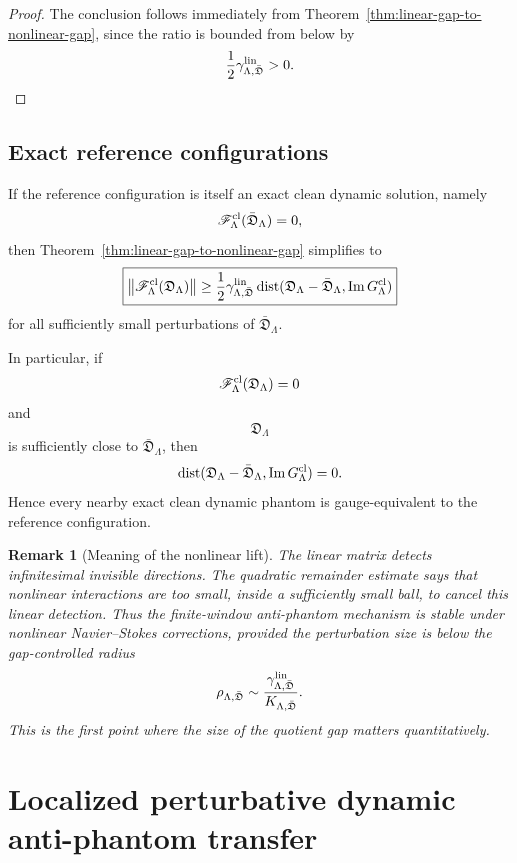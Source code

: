 \documentclass[11pt]{article}
\numberwithin{equation}{section}
\newtheorem{remark}[theorem]{Remark}
\begin{document}
\begin{proof}
The conclusion follows immediately from
Theorem~\ref{thm:linear-gap-to-nonlinear-gap}, since the ratio is bounded
from below by
\[
        \frac12
        \gamma_{\Lambda,\bar{\mathfrak D}}^{\rm lin}>0.
\]
\end{proof}

\subsection{Exact reference configurations}

If the reference configuration is itself an exact clean dynamic solution,
namely
\[
        \mathscr F_\Lambda^{\rm cl}(\bar{\mathfrak D}_\Lambda)=0,
\]
then Theorem~\ref{thm:linear-gap-to-nonlinear-gap} simplifies to
\[
\boxed{
        \left\|
        \mathscr F_\Lambda^{\rm cl}
        (\mathfrak D_\Lambda)
        \right\|
        \ge
        \frac12
        \gamma_{\Lambda,\bar{\mathfrak D}}^{\rm lin}
        \operatorname{dist}
        (\mathfrak D_\Lambda-\bar{\mathfrak D}_\Lambda,
        \operatorname{Im}G_\Lambda^{\rm cl})
}
\]
for all sufficiently small perturbations of
\(\bar{\mathfrak D}_\Lambda\).

In particular, if
\[
        \mathscr F_\Lambda^{\rm cl}
        (\mathfrak D_\Lambda)=0
\]
and
\[
        \mathfrak D_\Lambda
\]
is sufficiently close to
\(\bar{\mathfrak D}_\Lambda\), then
\[
        \operatorname{dist}
        (\mathfrak D_\Lambda-\bar{\mathfrak D}_\Lambda,
        \operatorname{Im}G_\Lambda^{\rm cl})
        =0.
\]
Hence every nearby exact clean dynamic phantom is gauge-equivalent to the
reference configuration.

\begin{remark}[Meaning of the nonlinear lift]
The linear matrix detects infinitesimal invisible directions.  The
quadratic remainder estimate says that nonlinear interactions are too
small, inside a sufficiently small ball, to cancel this linear detection.
Thus the finite-window anti-phantom mechanism is stable under nonlinear
Navier--Stokes corrections, provided the perturbation size is below the
gap-controlled radius
\[
        \rho_{\Lambda,\bar{\mathfrak D}}
        \sim
        \frac{
        \gamma_{\Lambda,\bar{\mathfrak D}}^{\rm lin}
        }
        {
        K_{\Lambda,\bar{\mathfrak D}}
        }.
\]
This is the first point where the size of the quotient gap matters
quantitatively.
\end{remark}


\section{Localized perturbative dynamic anti-phantom transfer}\label{sec:localized-transfer}
\end{document}
